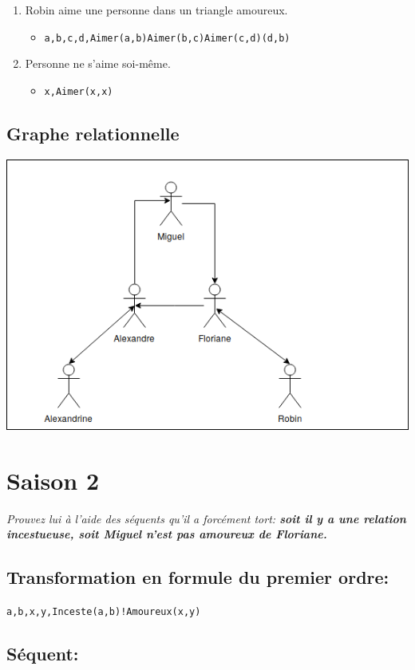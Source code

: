 \documentclass[Arial, 11pt]{article}
\begin{document}
\begin{enumerate}
\begin{itemize}
\begin{alltt}
        \end{alltt}
    \end{itemize}
    \item Robin aime une personne dans un triangle amoureux.
    \begin{itemize}
        \item \begin{alltt}\exists a,b,c,d, Aimer(a,b) \bigwedge Aimer(b,c) \bigwedge Aimer(c,d) \bigwedge (d,b)
        \end{alltt}
    \end{itemize}
    \item Personne ne s'aime soi-même.
    \begin{itemize}
        \item \begin{alltt}
        \forall x, \neg Aimer(x,x)
        \end{alltt}
    \end{itemize}
\end{enumerate}
\subsection*{Graphe relationnelle}
\includegraphics[width=\linewidth]{tp06.png}
\section{Saison 2}
\emph{
Prouvez lui à l’aide des séquents qu’il a forcément tort:
\textbf{soit il y a une relation incestueuse, soit Miguel n’est pas amoureux de Floriane.}}

\subsection*{Transformation en formule du premier ordre:}
\begin{alltt}
  \exists a,b,x,y, Inceste(a,b) \bigvee !Amoureux(x,y)
\end{alltt}

\subsection*{Séquent:}
\begin{alltt}
\end{alltt}
\end{document}
